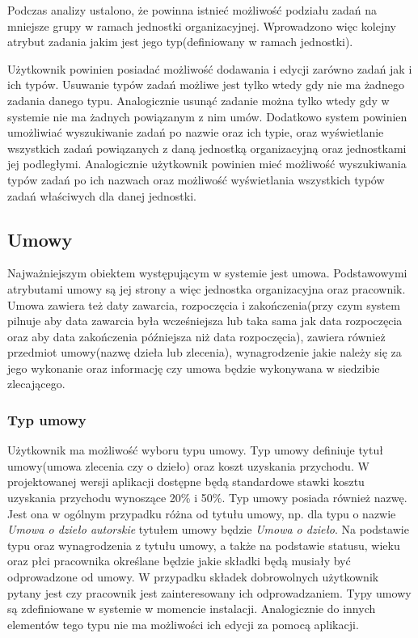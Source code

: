 Podczas analizy ustalono, że powinna istnieć możliwość podziału zadań na mniejsze grupy w ramach jednostki organizacyjnej. Wprowadzono więc kolejny atrybut zadania jakim jest jego typ(definiowany w ramach jednostki). 

Użytkownik powinien posiadać możliwość dodawania i edycji zarówno zadań jak i ich typów. Usuwanie typów zadań możliwe jest tylko wtedy gdy nie ma żadnego zadania danego typu. Analogicznie usunąć zadanie można tylko wtedy gdy w systemie nie ma żadnych powiązanym z nim umów. Dodatkowo system powinien umożliwiać wyszukiwanie zadań po nazwie oraz ich typie, oraz wyświetlanie wszystkich zadań powiązanych z daną jednostką organizacyjną oraz jednostkami jej podległymi. Analogicznie użytkownik powinien mieć możliwość wyszukiwania typów zadań po ich nazwach oraz możliwość wyświetlania wszystkich typów zadań właściwych dla danej jednostki.

\subsection[Umowy][Umowy]{Umowy}
Najważniejszym obiektem występującym w systemie jest umowa. Podstawowymi atrybutami umowy są jej strony a więc jednostka organizacyjna oraz pracownik. Umowa zawiera też daty zawarcia, rozpoczęcia i zakończenia(przy czym system pilnuje aby data zawarcia była wcześniejsza lub taka sama jak data rozpoczęcia oraz aby data zakończenia późniejsza niż data rozpoczęcia), zawiera również przedmiot umowy(nazwę dzieła lub zlecenia), wynagrodzenie jakie należy się za jego wykonanie oraz informację czy umowa będzie wykonywana w siedzibie zlecającego. 

\subsubsection{Typ umowy}
Użytkownik ma możliwość wyboru typu umowy. Typ umowy definiuje tytuł umowy(umowa zlecenia czy o dzieło) oraz koszt uzyskania przychodu. W projektowanej wersji aplikacji dostępne będą standardowe stawki kosztu uzyskania przychodu wynoszące 20\% i 50\%. Typ umowy posiada również nazwę. Jest ona w ogólnym przypadku różna od tytułu umowy, np. dla typu o nazwie \textit{Umowa o dzieło autorskie} tytułem umowy będzie \textit{Umowa o dzieło}. Na podstawie typu oraz wynagrodzenia z tytułu umowy, a także na podstawie statusu, wieku oraz płci pracownika określane będzie jakie składki będą musiały być odprowadzone od umowy. W przypadku składek dobrowolnych użytkownik pytany jest czy pracownik jest zainteresowany ich odprowadzaniem. Typy umowy są zdefiniowane w systemie w momencie instalacji. Analogicznie do innych elementów tego typu nie ma możliwości ich edycji za pomocą aplikacji.

